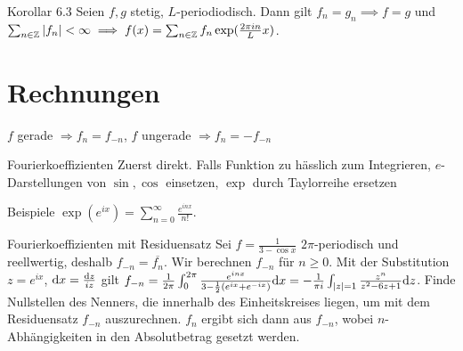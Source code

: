\begin{namedtheorem}{Korollar 6.3}
  Seien $f,g$ stetig, $L$-periodiodisch. Dann gilt $f_n=g_n \implies f=g$ und $\sum_{n\in\mathbb{Z}} |f_n| < \infty \implies f(x) = \sum_{n\in\mathbb{Z}}f_n \exp(\frac{2\pi in}L x)$.
\end{namedtheorem}

\section{Rechnungen}

$f$ gerade $\Rightarrow f_n=f_{-n}$, $f$ ungerade $\Rightarrow f_n=-f_{-n}$


\begin{namedtheorem}{Fourierkoeffizienten}
Zuerst direkt. Falls Funktion zu hässlich zum Integrieren, $e$-Darstellungen von $\sin,\cos$ einsetzen, $\exp$ durch Taylorreihe ersetzen
\end{namedtheorem}

\begin{namedtheorem}{Beispiele} $\exp(e^{ix}) = \sum_{n=0}^{\infty} \frac{e^{inx}}{n!}$.
\end{namedtheorem}

\begin{namedtheorem}{Fourierkoeffizienten mit Residuensatz}
Sei $f=\frac1{3-\cos x}$ $2\pi$-periodisch und reellwertig, deshalb $f_{-n}=\overline{f_n}$. Wir berechnen $f_{-n}$ für $n\geq0$. Mit der Substitution $z=e^{ix}$, $\mathrm{d}x=\frac{\mathrm{d} z}{iz}$ gilt $f_{-n}=\frac1{2\pi}\int_0^{2\pi}\frac{e^{inx}}{3-\frac12(e^{ix}+e^{-ix})}\mathrm{d}x=-\frac1{\pi i}\int_{|z|=1}\frac{z^n}{z^2-6z+1}\mathrm{d} z$. Finde Nullstellen des Nenners, die innerhalb des Einheitskreises liegen, um mit dem Residuensatz $f_{-n}$ auszurechnen. $f_n$ ergibt sich dann aus $f_{-n}$, wobei $n$-Abhängigkeiten in den Absolutbetrag gesetzt werden.
\end{namedtheorem}

